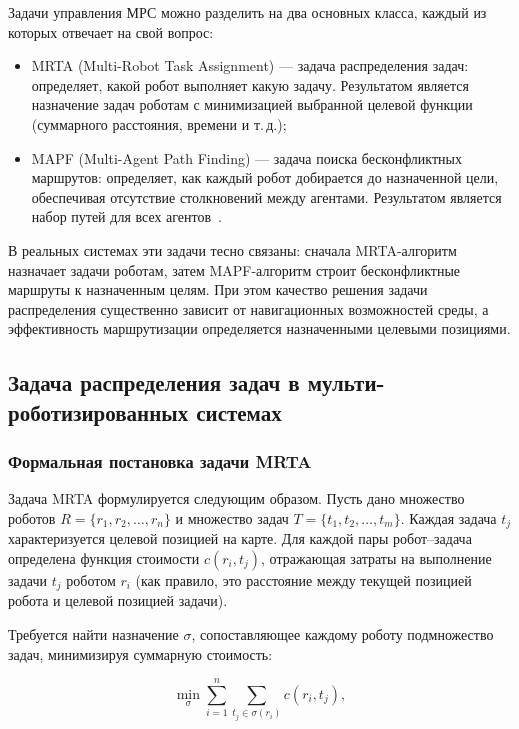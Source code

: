 Задачи управления МРС можно разделить на два основных класса, каждый из которых отвечает на свой вопрос:

\begin{itemize}
    \item MRTA (Multi-Robot Task Assignment) --- задача распределения задач: определяет, какой робот выполняет какую задачу. Результатом является назначение задач роботам с минимизацией выбранной целевой функции (суммарного расстояния, времени и т.\,д.);
    \item MAPF (Multi-Agent Path Finding) --- задача поиска бесконфликтных маршрутов: определяет, как каждый робот добирается до назначенной цели, обеспечивая отсутствие столкновений между агентами. Результатом является набор путей для всех агентов~\cite{stern2019mapf, gerkey2004taxonomy}.
\end{itemize}

В реальных системах эти задачи тесно связаны: сначала MRTA-алгоритм назначает задачи роботам, затем MAPF-алгоритм строит бесконфликтные маршруты к назначенным целям. При этом качество решения задачи распределения существенно зависит от навигационных возможностей среды, а эффективность маршрутизации определяется назначенными целевыми позициями.

\subsection{Задача распределения задач в мульти-роботизированных системах}

\subsubsection{Формальная постановка задачи MRTA}

Задача MRTA формулируется следующим образом. Пусть дано множество роботов $R = \{r_1, r_2, \ldots, r_n\}$ и множество задач $T = \{t_1, t_2, \ldots, t_m\}$. Каждая задача $t_j$ характеризуется целевой позицией на карте. Для каждой пары робот--задача определена функция стоимости $c(r_i, t_j)$, отражающая затраты на выполнение задачи $t_j$ роботом $r_i$ (как правило, это расстояние между текущей позицией робота и целевой позицией задачи).

Требуется найти назначение $\sigma$, сопоставляющее каждому роботу подмножество задач, минимизируя суммарную стоимость:

\begin{equation}
    \label{eq:mrta_objective}
    \min_{\sigma} \sum_{i=1}^{n} \sum_{t_j \in \sigma(r_i)} c(r_i, t_j),
\end{equation}

